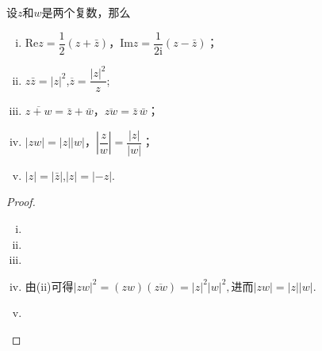 \documentclass[../../main.tex]{subfiles}
\begin{document}
\begin{proposition}[复数运算性质]\label{proposition:复数运算性质}
设\(z\)和\(w\)是两个复数，那么
\begin{enumerate}[(i)]
\item \(\mathrm{Re}z = \dfrac{1}{2}(z + \bar{z})\)，\(\mathrm{Im}z = \dfrac{1}{2\mathrm{i}}(z - \bar{z})\)；

\item \(z\bar{z} = |z|^2\),\(\overline{z} = \dfrac{|z|^2}{z}\);

\item \(\overline{z + w} = \bar{z} + \bar{w}\)，\(\overline{zw} = \bar{z}\,\bar{w}\)；

\item\(|zw| = |z||w|\)，\(\left| \dfrac{z}{w} \right| = \dfrac{|z|}{|w|}\)；

\item\(|z| = |\bar{z}|\),$|z|=|-z|$.
\end{enumerate}
\end{proposition}
\begin{proof}
\begin{enumerate}[(i)]
\item 

\item 

\item

\item 由(ii)可得$|zw|^2 = (zw)(\overline{zw}) = |z|^2|w|^2,$进而\(|zw| = |z||w|\).

\item
\end{enumerate}
\end{proof}
\end{document}
